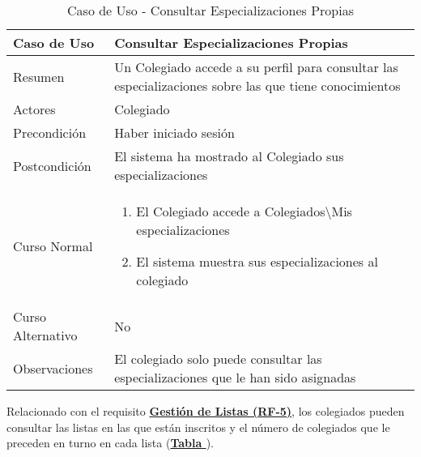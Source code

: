 \begin{table}[!htbp]
  \centering  \addtocounter{casouso}{1}
  \begin{tabular}{|l | p{100mm}|}
    \textbf{Caso de Uso}  & \textbf{Consultar Especializaciones Propias} \\ \hline
    Resumen 		 & Un Colegiado accede a su perfil para consultar las especializaciones sobre las que tiene conocimientos \\ \hline
    Actores  		 & Colegiado \\ \hline
    Precondición  	 & Haber iniciado sesión \\ \hline
    Postcondición  	 & El sistema ha mostrado al Colegiado sus especializaciones \\ \hline
    Curso Normal   	 & \begin{enumerate}
	  \item El Colegiado accede a Colegiados\textbackslash Mis especializaciones
	  \item El sistema muestra sus especializaciones al colegiado
    \end{enumerate}  \\ \hline
    Curso Alternativo  & No \\ \hline
    Observaciones 	 & El colegiado solo puede consultar las especializaciones que le han sido asignadas \\ \hline
  \end{tabular}
  \caption{Caso de Uso  - Consultar Especializaciones Propias}
  \label{tab:cucConsultaEspec}
\end{table}
\FloatBarrier

\addtocounter{tabla}{1}
Relacionado con el requisito \textbf{\hyperref[tab:rfGestLst]{Gestión de Listas (RF-5)}}, los colegiados pueden consultar las listas en las que están inscritos y el número de colegiados que le preceden en turno en cada lista (\textbf{\hyperref[tab:cucConsultaLista]{Tabla }}).

